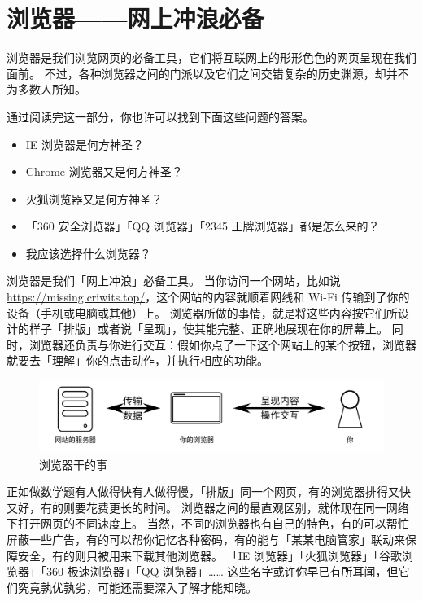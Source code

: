 \chapter{浏览器——网上冲浪必备}
\label{browsers-and-how-to-choose}

\begin{intro}
  浏览器是我们浏览网页的必备工具，它们将互联网上的形形色色的网页呈现在我们面前。
  不过，各种浏览器之间的门派以及它们之间交错复杂的历史渊源，却并不为多数人所知。
  
  通过阅读完这一部分，你也许可以找到下面这些问题的答案。
  
  \begin{itemize}
    \item IE 浏览器是何方神圣？
    \item Chrome 浏览器又是何方神圣？
    \item 火狐浏览器又是何方神圣？
    \item 「360 安全浏览器」「QQ 浏览器」「2345 王牌浏览器」都是怎么来的？
    \item 我应该选择什么浏览器？
  \end{itemize}
\end{intro}

浏览器是我们「网上冲浪」必备工具。
当你访问一个网站，比如说 \url{https://missing.criwits.top/}，这个网站的内容就顺着网线和 Wi-Fi 传输到了你的设备（手机或电脑或其他）上。
浏览器所做的事情，就是将这些内容按它们所设计的样子「排版」或者说「呈现」，使其能完整、正确地展现在你的屏幕上。
同时，浏览器还负责与你进行交互：假如你点了一下这个网站上的某个按钮，浏览器就要去「理解」你的点击动作，并执行相应的功能。

\begin{figure}[htb!]
  \centering
  \includegraphics[width=12cm]{assets/How_Browsers_work.png}
  \caption{浏览器干的事}
  \label{How_Browsers_work}
\end{figure}

正如做数学题有人做得快有人做得慢，「排版」同一个网页，有的浏览器排得又快又好，有的则要花费更长的时间。
浏览器之间的最直观区别，就体现在同一网络下打开网页的不同速度上。
当然，不同的浏览器也有自己的特色，有的可以帮忙屏蔽一些广告，有的可以帮你记忆各种密码，有的能与「某某电脑管家」联动来保障安全，有的则只被用来下载其他浏览器。
「IE 浏览器」「火狐浏览器」「谷歌浏览器」「360 极速浏览器」「QQ 浏览器」……
这些名字或许你早已有所耳闻，但它们究竟孰优孰劣，可能还需要深入了解才能知晓。

